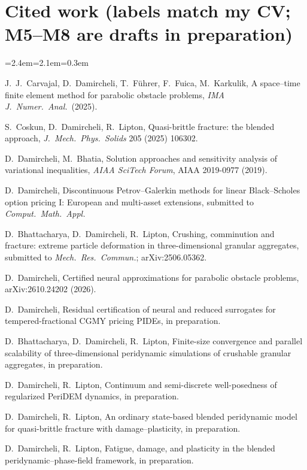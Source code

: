 \documentclass[11pt]{article}
\newcommand{\rc}[1]{\textcolor{accent}{[#1]}}
\begin{document}
\section*{Cited work {\normalfont\small(labels match my CV; M5--M8 are drafts in preparation)}}
{\footnotesize
\setlength{\parskip}{0pt}
\begin{list}{}{\leftmargin=2.4em=2.1em=0.3em\itemsep=0pt\parsep=0pt}
\item[\rc{J2}] J.~J.~Carvajal, D.~Damircheli, T.~F\"uhrer, F.~Fuica, M.~Karkulik, A space--time finite element method for parabolic obstacle problems, \emph{IMA J.\ Numer.\ Anal.}\ (2025).
\item[\rc{J3}] S.~Coskun, D.~Damircheli, R.~Lipton, Quasi-brittle fracture: the blended approach, \emph{J.\ Mech.\ Phys.\ Solids} 205 (2025) 106302.
\item[\rc{C1}] D.~Damircheli, M.~Bhatia, Solution approaches and sensitivity analysis of variational inequalities, \emph{AIAA SciTech Forum}, AIAA 2019-0977 (2019).
\item[\rc{S3}] D.~Damircheli, Discontinuous Petrov--Galerkin methods for linear Black--Scholes option pricing I: European and multi-asset extensions, submitted to \emph{Comput.\ Math.\ Appl.}
\item[\rc{S5}] D.~Bhattacharya, D.~Damircheli, R.~Lipton, Crushing, comminution and fracture: extreme particle deformation in three-dimensional granular aggregates, submitted to \emph{Mech.\ Res.\ Commun.}; arXiv:2506.05362.
\item[\rc{P1}] D.~Damircheli, Certified neural approximations for parabolic obstacle problems, arXiv:2610.24202 (2026).
\item[\rc{M1}] D.~Damircheli, Residual certification of neural and reduced surrogates for tempered-fractional CGMY pricing PIDEs, in preparation.
\item[\rc{M5}] D.~Bhattacharya, D.~Damircheli, R.~Lipton, Finite-size convergence and parallel scalability of three-dimensional peridynamic simulations of crushable granular aggregates, in preparation.
\item[\rc{M6}] D.~Damircheli, R.~Lipton, Continuum and semi-discrete well-posedness of regularized PeriDEM dynamics, in preparation. %
\item[\rc{M7}] D.~Damircheli, R.~Lipton, An ordinary state-based blended peridynamic model for quasi-brittle fracture with damage--plasticity, in preparation. %
\item[\rc{M8}] D.~Damircheli, R.~Lipton, Fatigue, damage, and plasticity in the blended peridynamic--phase-field framework, in preparation. %
\end{list}
}
\end{document}
